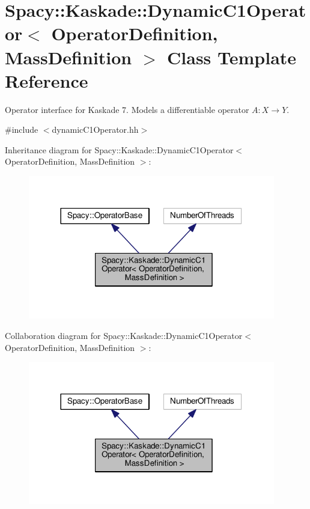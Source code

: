 \hypertarget{classSpacy_1_1Kaskade_1_1DynamicC1Operator}{}\section{Spacy\+:\+:Kaskade\+:\+:Dynamic\+C1\+Operator$<$ Operator\+Definition, Mass\+Definition $>$ Class Template Reference}
\label{classSpacy_1_1Kaskade_1_1DynamicC1Operator}


Operator interface for Kaskade 7. Models a differentiable operator $A:X\rightarrow Y$.  




{\ttfamily \#include $<$dynamic\+C1\+Operator.\+hh$>$}



Inheritance diagram for Spacy\+:\+:Kaskade\+:\+:Dynamic\+C1\+Operator$<$ Operator\+Definition, Mass\+Definition $>$\+:
\nopagebreak
\begin{figure}[H]
\begin{center}
\leavevmode
\includegraphics[width=306pt]{classSpacy_1_1Kaskade_1_1DynamicC1Operator__inherit__graph}
\end{center}
\end{figure}


Collaboration diagram for Spacy\+:\+:Kaskade\+:\+:Dynamic\+C1\+Operator$<$ Operator\+Definition, Mass\+Definition $>$\+:
\nopagebreak
\begin{figure}[H]
\begin{center}
\leavevmode
\includegraphics[width=306pt]{classSpacy_1_1Kaskade_1_1DynamicC1Operator__coll__graph}
\end{center}
\end{figure}
